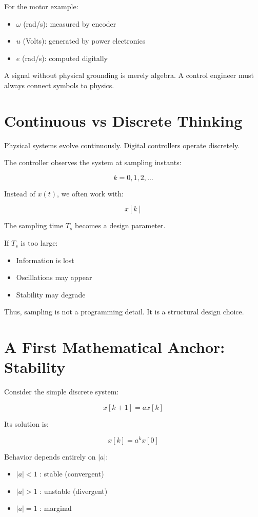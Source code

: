 For the motor example:

\begin{itemize}
	\item $\omega$ (rad/s): measured by encoder
	\item $u$ (Volts): generated by power electronics
	\item $e$ (rad/s): computed digitally
\end{itemize}

A signal without physical grounding is merely algebra.
A control engineer must always connect symbols to physics.

\section{Continuous vs Discrete Thinking}

Physical systems evolve continuously.
Digital controllers operate discretely.

The controller observes the system at sampling instants:

\[
k = 0, 1, 2, \dots
\]

Instead of $x(t)$, we often work with:

\[
x[k]
\]

The sampling time $T_s$ becomes a design parameter.

If $T_s$ is too large:
\begin{itemize}
	\item Information is lost
	\item Oscillations may appear
	\item Stability may degrade
\end{itemize}

Thus, sampling is not a programming detail.
It is a structural design choice.

\section{A First Mathematical Anchor: Stability}

Consider the simple discrete system:

\[
x[k+1] = a x[k]
\]

Its solution is:

\[
x[k] = a^k x[0]
\]

Behavior depends entirely on $|a|$:

\begin{itemize}
	\item $|a| < 1$ : stable (convergent)
	\item $|a| > 1$ : unstable (divergent)
	\item $|a| = 1$ : marginal
\end{itemize}


